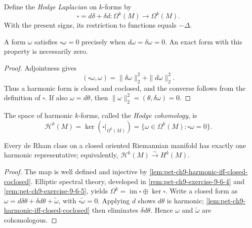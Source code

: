 \begin{definition}
  \label{def:pet-ch9-hodge-laplacian}

  Define the \emph{Hodge Laplacian} on $k$-forms by
  \[
    \square=d\delta+\delta d:\Omega^k(M)\longrightarrow\Omega^k(M).
  \]
  With the present signs, its restriction to functions equals $-\Delta$.
\end{definition}

\begin{lemma}
  \label{lem:pet-ch9-harmonic-iff-closed-coclosed}

  A form $\omega$ satisfies $\square\omega=0$ precisely when
  $d\omega=\delta\omega=0$.  An exact form with this property is necessarily
  zero.
\end{lemma}
\begin{proof}
  \sketch
  Adjointness gives
  \[
    (\square\omega,\omega)=\|\delta\omega\|_2^2+\|d\omega\|_2^2.
  \]
  Thus a harmonic form is closed and coclosed, and the converse follows from
  the definition of \(\square\).  If also \(\omega=d\theta\), then
  \(\|\omega\|_2^2=(\theta,\delta\omega)=0\).
\end{proof}

\begin{definition}
  \label{def:pet-ch9-hodge-cohomology}

  The space of harmonic $k$-forms, called the \emph{Hodge cohomology}, is
  \[
    \mathcal H^k(M)=\ker(\square|_{\Omega^k(M)})
      =\{\omega\in\Omega^k(M):\square\omega=0\}.
  \]
\end{definition}

\begin{theorem}
  \label{thm:pet-ch9-hodge-theorem}

  Every de Rham class on a closed oriented Riemannian manifold has exactly one
  harmonic representative; equivalently,
  $\mathcal H^k(M)\xrightarrow{\sim}H^k(M)$.
\end{theorem}
\begin{proof}
  \sketch
  The map is well defined and injective by
  \cref{lem:pet-ch9-harmonic-iff-closed-coclosed}.  Elliptic spectral theory,
  developed in \cref{rem:pet-ch9-exercise-9-6-4} and
  \cref{rem:pet-ch9-exercise-9-6-5}, yields
  \(\Omega^k=\operatorname{im}\square\oplus\ker\square\).  Write a closed form as
  \(\omega=d\delta\theta+\delta d\theta+\widetilde\omega\), with
  \(\square\widetilde\omega=0\).  Applying \(d\) shows \(d\theta\) is harmonic;
  \cref{lem:pet-ch9-harmonic-iff-closed-coclosed} then eliminates
  \(\delta d\theta\).  Hence \(\omega\) and \(\widetilde\omega\) are cohomologous.
\end{proof}


